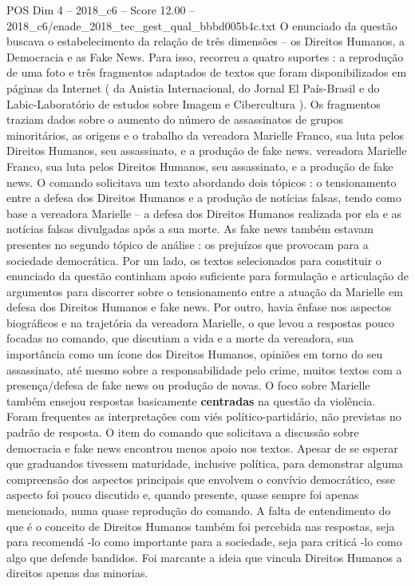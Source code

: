 \begin{textsample}{POS Dim 4 – 2018\_c6 – Score 12.00 – 2018\_c6/enade\_2018\_tec\_gest\_qual\_bbbd005b4c.txt}
O enunciado da questão buscava o estabelecimento da relação de três dimensões – os Direitos Humanos, a Democracia e as Fake News.
Para isso, recorreu a quatro suportes : a reprodução de uma foto e três fragmentos adaptados de textos que foram disponibilizados em páginas da Internet ( da Anistia Internacional, do Jornal El País-Brasil e do Labic-Laboratório de estudos sobre Imagem e Cibercultura ).
Os fragmentos traziam dados sobre o aumento do número de assassinatos de grupos minoritários, as origens e o trabalho da vereadora Marielle Franco, sua luta pelos Direitos Humanos, seu assassinato, e a produção de fake news. vereadora Marielle Franco, sua luta pelos Direitos Humanos, seu assassinato, e a produção de fake news.
O comando solicitava um texto abordando dois tópicos : o tensionamento entre a defesa dos Direitos Humanos e a produção de notícias falsas, tendo como base a vereadora Marielle – a defesa dos Direitos Humanos realizada por ela e as notícias falsas divulgadas após a sua morte.
As fake news também estavam presentes no segundo tópico de análise : os prejuízos que provocam para a sociedade democrática.
Por um lado, os textos selecionados para constituir o enunciado da questão continham apoio suficiente para formulação e articulação de argumentos para discorrer sobre o tensionamento entre a atuação da Marielle em defesa dos Direitos Humanos e fake news.
Por outro, havia ênfase nos aspectos biográficos e na trajetória da vereadora Marielle, o que levou a respostas pouco focadas no comando, que discutiam a vida e a morte da vereadora, sua importância como um ícone dos Direitos Humanos, opiniões em torno do seu assassinato, até mesmo sobre a responsabilidade pelo crime, muitos textos com a presença/defesa de fake news ou produção de novas.
O foco sobre Marielle também ensejou respostas basicamente \textbf{centradas} na questão da violência.
Foram frequentes as interpretações com viés político-partidário, não previstas no padrão de resposta.
O item do comando que solicitava a discussão sobre democracia e fake news encontrou menos apoio nos textos.
Apesar de se esperar que graduandos tivessem maturidade, inclusive política, para demonstrar alguma compreensão dos aspectos principais que envolvem o convívio democrático, esse aspecto foi pouco discutido e, quando presente, quase sempre foi apenas mencionado, numa quase reprodução do comando.
A falta de entendimento do que é o conceito de Direitos Humanos também foi percebida nas respostas, seja para recomendá -lo como importante para a sociedade, seja para criticá -lo como algo que defende bandidos.
Foi marcante a ideia que vincula Direitos Humanos a direitos apenas das minorias.

\end{textsample}
